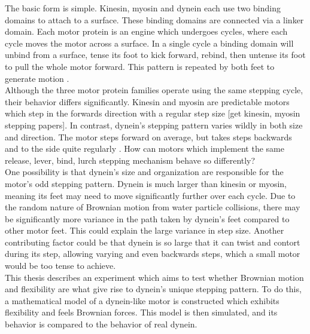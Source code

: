 \documentclass[10pt]{article} %
\begin{document}
The basic form is simple. Kinesin, myosin and dynein each use two binding domains to attach to a surface. These binding domains are connected via a linker domain. Each motor protein is an engine which undergoes cycles, where each cycle moves the motor across a surface. In a single cycle a binding domain will unbind from a surface, tense its foot to kick forward, rebind, then untense its foot to pull the whole motor forward. This pattern is repeated by both feet to generate motion \cite{kinesin-cycle} \cite{myosin-cycle}.\\

Although the three motor protein families operate using the same stepping cycle, their behavior differs significantly. Kinesin and myosin are predictable motors which step in the forwards direction with a regular step size [get kinesin, myosin stepping papers]. In contrast, dynein's stepping pattern varies wildly in both size and direction. The motor steps forward on average, but takes steps backwards and to the side quite regularly \cite{weihongpaper}. How can motors which implement the same release, lever, bind, lurch stepping mechanism behave so differently?\\

One possibility is that dynein's size and organization are responsible for the motor's odd stepping pattern. Dynein is much larger than kinesin or myosin, meaning its feet may need to move significantly further over each cycle. Due to the random nature of Brownian motion from water particle collisions, there may be significantly more variance in the path taken by dynein's feet compared to other motor feet. This could explain the large variance in step size. Another contributing factor could be that dynein is so large that it can twist and contort during its step, allowing varying and even backwards steps, which a small motor would be too tense to achieve.\\

This thesis describes an experiment which aims to test whether Brownian motion and flexibility are what give rise to dynein's unique stepping pattern. To do this, a mathematical model of a dynein-like motor is constructed which exhibits flexibility and feels Brownian forces. This model is then simulated, and its behavior is compared to the behavior of real dynein.\\

\end{document}
